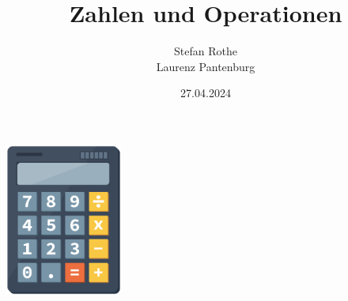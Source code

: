 \documentclass[parskip=half]{scrartcl}
\title{Zahlen und Operationen}
\author{Stefan Rothe\\
Laurenz Pantenburg}
\date{27.04.2024}
\begin{document}
  \maketitle
  \thispagestyle{firstpage}
  \begin{center}
    \includegraphics[height=50mm]{calculator.pdf}
  \end{center}
  \tableofcontents
  \clearpage
  ~
  \thispagestyle{empty}
  \clearpage

  
  
  
  
  
  
  
  
  
  
  
  
  
  
  
%  
\end{document}
